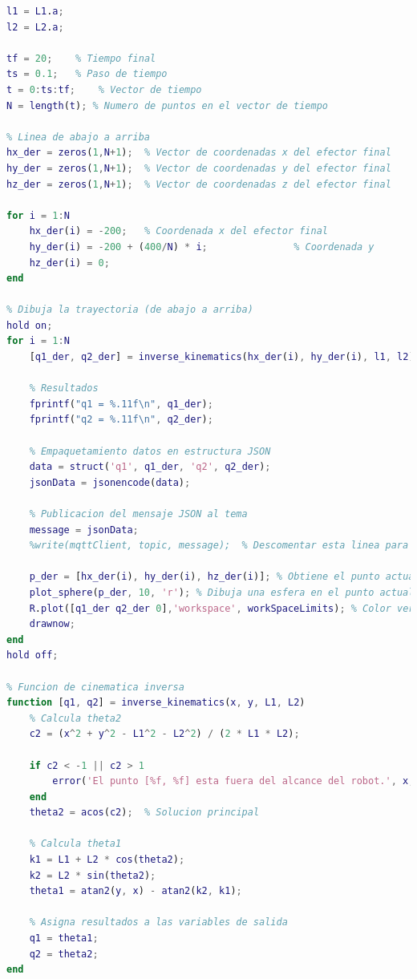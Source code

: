 \documentclass[final]{foresj}
\begin{document}
\begin{lstlisting}[language=Matlab]
% Longitudes de los eslabones, usadas en la cinematica inversa
l1 = L1.a;
l2 = L2.a;

tf = 20;    % Tiempo final
ts = 0.1;   % Paso de tiempo
t = 0:ts:tf;    % Vector de tiempo
N = length(t); % Numero de puntos en el vector de tiempo

% Linea de abajo a arriba
hx_der = zeros(1,N+1);  % Vector de coordenadas x del efector final
hy_der = zeros(1,N+1);  % Vector de coordenadas y del efector final
hz_der = zeros(1,N+1);  % Vector de coordenadas z del efector final

for i = 1:N
    hx_der(i) = -200;   % Coordenada x del efector final
    hy_der(i) = -200 + (400/N) * i;               % Coordenada y
    hz_der(i) = 0;
end

% Dibuja la trayectoria (de abajo a arriba)
hold on;
for i = 1:N
    [q1_der, q2_der] = inverse_kinematics(hx_der(i), hy_der(i), l1, l2); 

    % Resultados
    fprintf("q1 = %.11f\n", q1_der);
    fprintf("q2 = %.11f\n", q2_der);

    % Empaquetamiento datos en estructura JSON
    data = struct('q1', q1_der, 'q2', q2_der);
    jsonData = jsonencode(data);

    % Publicacion del mensaje JSON al tema
    message = jsonData;
    %write(mqttClient, topic, message);  % Descomentar esta linea para enviar el mensaje

    p_der = [hx_der(i), hy_der(i), hz_der(i)]; % Obtiene el punto actual de la trayectoria
    plot_sphere(p_der, 10, 'r'); % Dibuja una esfera en el punto actual para visualizar la trayectoria (color verde)
    R.plot([q1_der q2_der 0],'workspace', workSpaceLimits); % Color verde
    drawnow;
end
hold off;

% Funcion de cinematica inversa
function [q1, q2] = inverse_kinematics(x, y, L1, L2)
    % Calcula theta2
    c2 = (x^2 + y^2 - L1^2 - L2^2) / (2 * L1 * L2);

    if c2 < -1 || c2 > 1
        error('El punto [%f, %f] esta fuera del alcance del robot.', x, y);
    end
    theta2 = acos(c2);  % Solucion principal

    % Calcula theta1
    k1 = L1 + L2 * cos(theta2);
    k2 = L2 * sin(theta2);
    theta1 = atan2(y, x) - atan2(k2, k1);

    % Asigna resultados a las variables de salida
    q1 = theta1;
    q2 = theta2;
end
\end{lstlisting}
\end{document}
